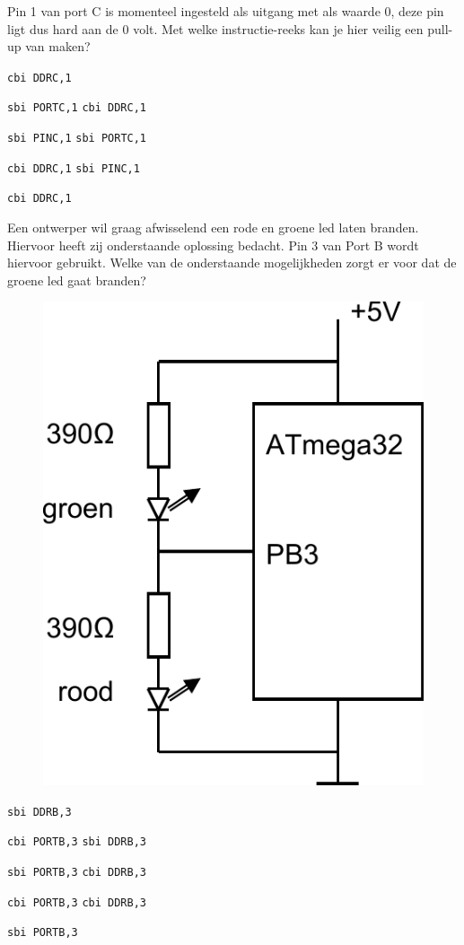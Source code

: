 \documentclass[a4paper,12pt,fleqn,dutch,mimicwordtwentyten]{tisdexam}
\begin{document}
\begin{questions}
\question
\label{opg:opg8}
Pin 1 van port C is momenteel ingesteld als uitgang met als waarde 0, deze pin ligt dus hard
aan de 0 volt. Met welke instructie-reeks kan je hier veilig een pull-up van maken?
\begin{choices}
	\CorrectChoice \label{ans:opg8} \lstinline|cbi DDRC,1| \par \lstinline|sbi PORTC,1|
	\choice \lstinline|cbi DDRC,1| \par \lstinline|sbi PINC,1|
	\choice \lstinline|sbi PORTC,1| \par \lstinline|cbi DDRC,1|
	\choice \lstinline|sbi PINC,1| \par \lstinline|cbi DDRC,1|
\end{choices}


\question
\label{opg:opg9}
Een ontwerper wil graag afwisselend een rode en groene led laten branden. Hiervoor heeft zij
onderstaande oplossing bedacht. Pin 3 van Port B wordt hiervoor gebruikt. Welke van de
onderstaande mogelijkheden zorgt er voor dat de groene led gaat branden?
\begin{figure}[H]
  \centering
    \includegraphics[scale=0.55]{pINLMIC_led_schak.pdf}
\end{figure}
\begin{choices}
	\CorrectChoice \label{ans:opg9} \lstinline|sbi DDRB,3| \par \lstinline|cbi PORTB,3|
	\choice \lstinline|sbi DDRB,3| \par \lstinline|sbi PORTB,3|
	\choice \lstinline|cbi DDRB,3| \par \lstinline|cbi PORTB,3|
	\choice \lstinline|cbi DDRB,3| \par \lstinline|sbi PORTB,3|
\end{choices}



\end{questions}
\end{document}
